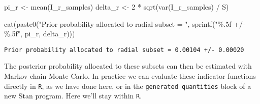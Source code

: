 \documentclass[
  letterpaper,
  DIV=11,
  numbers=noendperiod]{scrartcl}
\newenvironment{Shaded}{\begin{snugshade}}{\end{snugshade}}
\newcommand{\DecValTok}[1]{\textcolor[rgb]{0.68,0.00,0.00}{#1}}
\newcommand{\FunctionTok}[1]{\textcolor[rgb]{0.28,0.35,0.67}{#1}}
\newcommand{\NormalTok}[1]{\textcolor[rgb]{0.00,0.23,0.31}{#1}}
\newcommand{\OtherTok}[1]{\textcolor[rgb]{0.00,0.23,0.31}{#1}}
\newcommand{\SpecialCharTok}[1]{\textcolor[rgb]{0.37,0.37,0.37}{#1}}
\newcommand{\StringTok}[1]{\textcolor[rgb]{0.13,0.47,0.30}{#1}}
\begin{document}
\begin{Shaded}
\begin{Highlighting}[]
\NormalTok{pi\_r }\OtherTok{\textless{}{-}} \FunctionTok{mean}\NormalTok{(I\_r\_samples)}
\NormalTok{delta\_r }\OtherTok{\textless{}{-}} \DecValTok{2} \SpecialCharTok{*} \FunctionTok{sqrt}\NormalTok{(}\FunctionTok{var}\NormalTok{(I\_r\_samples) }\SpecialCharTok{/}\NormalTok{ S)}

\FunctionTok{cat}\NormalTok{(}\FunctionTok{paste0}\NormalTok{(}\StringTok{"Prior probability allocated to radial subset = "}\NormalTok{,}
           \FunctionTok{sprintf}\NormalTok{(}\StringTok{"\%.5f +/{-} \%.5f"}\NormalTok{, pi\_r, delta\_r)))}
\end{Highlighting}
\end{Shaded}

\begin{verbatim}
Prior probability allocated to radial subset = 0.00104 +/- 0.00020
\end{verbatim}

The posterior probability allocated to these subsets can then be
estimated with Markov chain Monte Carlo. In practice we can evaluate
these indicator functions directly in \texttt{R}, as we have done here,
or in the \texttt{generated\ quantities} block of a new Stan program.
Here we'll stay within \texttt{R}.
\end{document}

